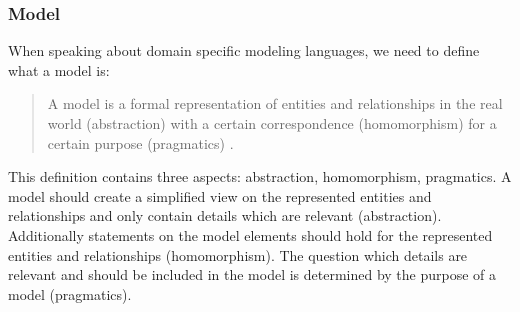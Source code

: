 \documentclass[runningheads,a4paper]{llncs}
\begin{document}
\subsubsection{Model}
% 
%  
%  
  When speaking about domain specific modeling languages, we need to define what a model is:
  
  \begin{quote}
   A model is a formal representation of entities and relationships in the real world (abstraction) 
  with a certain correspondence (homomorphism) for a certain purpose (pragmatics) \cite{stachowiak1973allgemeine}.
  \end{quote}
  
  This definition contains three aspects: abstraction, homomorphism, pragmatics.
  A model should create a simplified view on the represented entities and relationships and 
  only contain details which are relevant (abstraction).
  Additionally statements on the model elements should hold for the represented entities and relationships (homomorphism).
  The question which details are relevant and should be included in the model is determined by the purpose of a model (pragmatics).  
 
\end{document}

